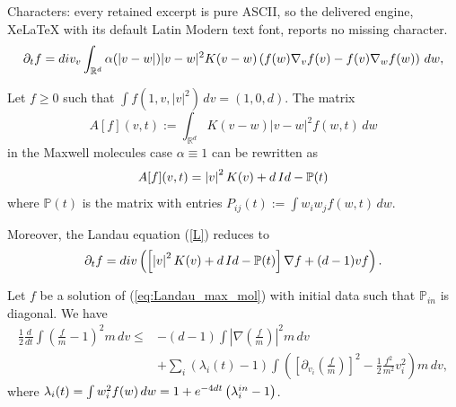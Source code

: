 \documentclass[10pt,a4paper]{amsart}
\begin{document}
Characters: every retained excerpt is pure ASCII, so the delivered engine, XeLaTeX with its default Latin Modern text font, reports no missing character.
\begin{equation}\label{L}
  \partial_t f = \textnormal{div}_{v}\int_{\mathbb{R}^{d}}
  \alpha(\vert v-w\vert )\vert v-w\vert^2 K(v-w)\left(f(w)\nabla_{v}f(v)-f(v)\nabla_{w}f(w)\right)\,dw,
\end{equation}

\begin{proposition}
Let $f\ge 0$ such that $\int f(1,v,|v|^2)\,dv =(1,0,d)$.     The matrix 
  $$A[f](v,t):=\int_{\mathbb{R}^{d}}{K(v-w)}{\vert{v-w}\vert^{2}}f(w,t)\,dw$$
  in the Maxwell molecules case $ \alpha \equiv 1$ can be rewritten as 
  $$A[f](v,t)=\left\vert v \right\vert ^{2}K(v)+d\,\textnormal{Id} - \mathbb{P}(t)$$
   where $\mathbb{P}(t)$ is the matrix with entries $P_{ij}(t):=\int w_iw_jf(w,t)\,dw$. 
   
   Moreover, the Landau equation (\ref{L}) reduces to
  \begin{equation}\label{eq:Landau_max_mol}
    \partial_t f = \textnormal{div}\left( 
      \left[ \left\vert v \right\vert ^{2}K(v) + d\, \textnormal{Id}  - \mathbb{P}(t) \right]\nabla f
      + (d-1)vf
     \right).
  \end{equation}
\end{proposition}

\begin{lemma}\label{lem:ineq_lambda_minus1}
  Let $f$ be a solution of (\ref{eq:Landau_max_mol}) with initial data such that $\mathbb{P}_{in}$ is diagonal. We have
  \begin{align*}
    \frac{1}{2}\frac{d}{dt}\int\left(\frac{f}{ m }-1\right)^{2} m \,dv \leq 
   & -(d-1)\int \left\vert\nabla\left(\frac{f}{ m } \right)\right\vert^{2} m \,dv \\
   & +\sum_{i}(\lambda_{i}(t) -1)\int\left(\left[\partial_{v_{i}}\left(\frac{f}{ m } \right)\right]^{2}-\frac{1}{2}\frac{f^{2}}{ m ^{2}}v_{i}^{2}\right) m\,dv,
  \end{align*}
  where $\lambda_{i}(t)=\int w_i^2 f(w)\,dw=1+e^{-4dt}\left(\lambda_{i}^{\textnormal{in}}-1\right)$.
\end{lemma}
\end{document}
